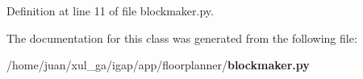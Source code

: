 \subsubsection{}\label{classapp_1_1floorplanner_1_1blockmaker_1_1BlockMaker_ef30d188588d13342fc8eb7a64009365}




Definition at line 11 of file blockmaker.py.

The documentation for this class was generated from the following file:\begin{CompactItemize}
\item 
/home/juan/xul\_\-ga/igap/app/floorplanner/{\bf blockmaker.py}\end{CompactItemize}

